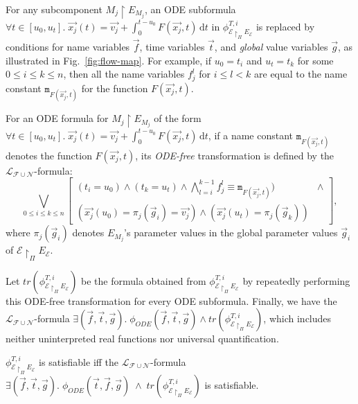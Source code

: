 For any subcomponent $M_j \restriction E_{M_j}$,
an ODE subformula $\forall t \in [u_0,u_t].\; \vec{x_j}(t) = \vec{v_j} + \int_0^{t-u_0} \!  F(\vec{x_j},t)\,\mathrm{d}t$ 
in $\phi_{\mathcal{E} \restriction_{\Pi} E_\mathcal{E}}^{T,i}$
is replaced by conditions for name variables $\vec{f}$, time variables $\vec{t}$, and 
\emph{global} value variables $\vec{g}$,
as illustrated in Fig.~\ref{fig:flow-map}.
For example, if $u_0 = t_i$ and $u_t = t_k$ for some $0 \leq i \leq k \leq n$,
then all the name variables $f_j^l$ for $i \leq l < k$ are equal to 
the name constant $\mathtt{m}_{F(\vec{x_j},t)}$ for the function $F(\vec{x_j},t)$.


\begin{definition}
For an ODE formula for $M_j \restriction E_{M_j}$ of the form 
$\forall t \in [u_0,u_t].\; \vec{x_j}(t) = \vec{v_j} + \int_0^{t-u_0} \!  F(\vec{x_j},t)\,\mathrm{d}t$, 
if a name constant $\mathtt{m}_{F(\vec{x_j},t)}$ denotes the function $F(\vec{x_j},t)$,
its \emph{ODE-free} transformation is defined by the $\mathcal{L}_{\mathcal{F}\cup\mathcal{N}}$-formula:
\[
\bigvee_{0 \leq i \leq k \leq n} 
\left[
\begin{aligned}
(t_i = u_0) \wedge (t_k = u_t) \wedge \textstyle\bigwedge_{l=i}^{k-1} f^l_j \equiv \mathtt{m}_{F(\vec{x_j},t)}  ) &\wedge
\\
(\vec{x_j}(u_0) = \pi_j(\vec{g}_i) = \vec{v_j}) \wedge  (\vec{x_j}(u_t) = \pi_j(\vec{g}_k))
\end{aligned}
\right],
\]
where $\pi_j(\vec{g}_i)$ denotes $E_{M_j}$'s parameter values 
in the global parameter values $\vec{g}_i$ of $\mathcal{E} \restriction_{\Pi} E_\mathcal{E}$.
\end{definition}

Let $\mathit{tr}(\phi_{\mathcal{E} \restriction_{\Pi} E_\mathcal{E}}^{T,i})$ 
be the formula
obtained from $\phi_{\mathcal{E} \restriction_{\Pi} E_\mathcal{E}}^{T,i}$ 
by repeatedly performing this ODE-free transformation
for every ODE subformula.
Finally, we have the $\mathcal{L}_{\mathcal{F}\cup\mathcal{N}}$-formula 
$\exists (\vec{f}, \vec{t}, \vec{g}).\; \phi_{\mathit{ODE}}(\vec{f},\vec{t},\vec{g}) \wedge \mathit{tr}(\phi_{\mathcal{E} \restriction_{\Pi} E_\mathcal{E}}^{T,i})$,
which
includes neither uninterpreted real functions nor universal quantification.

\begin{theorem}
$\phi_{\mathcal{E} \restriction_{\Pi} E_\mathcal{E}}^{T,i}$
is satisfiable
iff
the $\mathcal{L}_{\mathcal{F}\cup\mathcal{N}}$-formula 
$\exists (\vec{f}, \vec{t}, \vec{g}).\; \phi_{\mathit{ODE}}(\vec{t},\vec{f},\vec{g}) \;\wedge\; \mathit{tr}(\phi_{\mathcal{E} \restriction_{\Pi} E_\mathcal{E}}^{T,i})$
is satisfiable.
\end{theorem}









